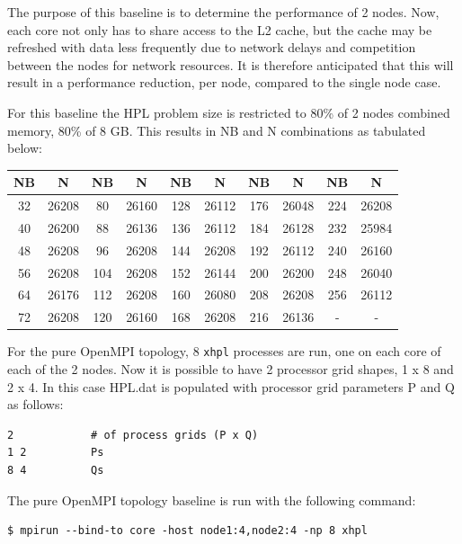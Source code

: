 \documentclass{report}
\begin{document}
The purpose of this baseline is to determine the performance of 2 nodes. Now, each core not only has to share access to the L2 cache, but the cache may be refreshed with data less frequently due to network delays and competition between the nodes for network resources. It is therefore anticipated that this will result in a performance reduction, per node, compared to the single node case.

For this baseline the HPL problem size is restricted to 80\% of 2 nodes combined memory, 80\% of 8 GB. This results in NB and N combinations as tabulated below:

\begin{center}
	\begin{tabular}{ |c|c|c|c|c|c|c|c|c|c| } 
		\hline
		NB & N & NB & N & NB & N & NB & N & NB & N \\ 
		\hline
		32 & 26208 &  80 & 26160 & 128 & 26112 & 176 & 26048 & 224 & 26208 \\ 
		40 & 26200 &  88 & 26136 & 136 & 26112 & 184 & 26128 & 232 & 25984 \\ 
 		48 & 26208 &  96 & 26208 & 144 & 26208 & 192 & 26112 & 240 & 26160 \\
		56 & 26208 & 104 & 26208 & 152 & 26144 & 200 & 26200 & 248 & 26040 \\ 
 		64 & 26176 & 112 & 26208 & 160 & 26080 & 208 & 26208 & 256 & 26112 \\
		72 & 26208 & 120 & 26160 & 168 & 26208 & 216 & 26136 &   - &     - \\ 
 		\hline
	\end{tabular}
\end{center}

For the pure OpenMPI topology, 8 \verb|xhpl| processes are run, one on each core of each of the 2 nodes. Now it is possible to have 2 processor grid shapes, 1 x 8 and 2 x 4. In this case HPL.dat is populated with processor grid parameters P and Q as follows:

\lstset{style=listing}
\begin{lstlisting}[numbers=none]
2            # of process grids (P x Q)
1 2          Ps
8 4          Qs
\end{lstlisting}

The pure OpenMPI topology baseline is run with the following command:

\lstset{style=type}
\begin{lstlisting}[]
$ mpirun --bind-to core -host node1:4,node2:4 -np 8 xhpl
\end{lstlisting}
\end{document}
